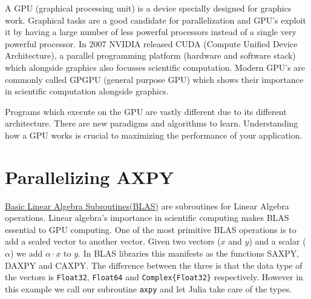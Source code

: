 \documentclass[12pt,a4paper]{article}
\begin{document}
A GPU (graphical processing unit) is a device specially designed for graphics work. Graphical tasks are a good candidate for parallelization and  GPU's exploit it by having a large number of less powerful processors instead of a single very powerful processor. In 2007 NVIDIA released CUDA (Compute Unified Device Architecture), a parallel programming platform (hardware and software stack) which alongside graphics also focusses scientific computation. Modern GPU's are commonly called GPGPU (general purpose GPU) which shows their importance in scientific computation alongside graphics.

Programs which execute on the GPU are vastly different due to its different architecture. There are new paradigms and algorithms to learn. Understanding how a GPU works is crucial to maximizing the performance of your application.

\section{Parallelizing AXPY}
\href{https://en.wikipedia.org/wiki/Basic_Linear_Algebra_Subprograms}{Basic Linear Algebra Subroutines(BLAS)} are subroutines for Linear Algebra operations. Linear algebra's importance in scientific computing makes BLAS essential to GPU computing. One of the most primitive BLAS operations is to add a scaled vector to another vector. Given two vectors ($x$ and $y$) and a scalar ($\alpha$) we add $\alpha\cdot x$ to $y$. In BLAS libraries this manifests as the functions SAXPY, DAXPY and CAXPY. The difference between the three is that the data type of the vectors is \texttt{Float32}, \texttt{Float64} and \texttt{Complex\{Float32\}} respectively. However in this example we call our subroutine \texttt{axpy} and let Julia take care of the types.
\end{document}
